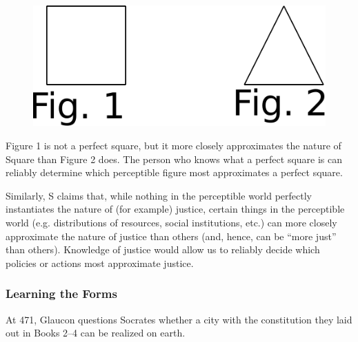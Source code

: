 \documentclass[oneside]{article}
\begin{document}
\begin{figure}[h!]
\hspace*{35mm}
\includegraphics[scale=0.6]{figure1}
\end{figure}
Figure 1 is not a perfect square, but it more closely approximates the nature of Square than Figure 2 does. The person who knows what a perfect square is can reliably determine which perceptible figure most approximates a perfect square.

Similarly, S claims that, while nothing in the perceptible world perfectly instantiates the nature of (for example) justice, certain things in the perceptible world (e.g. distributions of resources, social institutions, etc.) can more closely approximate the nature of justice than others (and, hence, can be ``more just'' than others). Knowledge of justice would allow us to reliably decide which policies or actions most approximate justice.



\subsubsection*{Learning the Forms}

At 471, Glaucon questions Socrates whether a city with the constitution they laid out in Books 2--4 can be realized on earth. 
\end{document}
